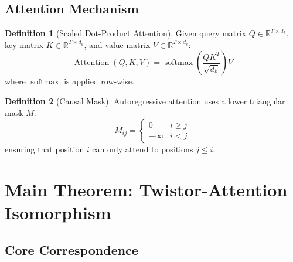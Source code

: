 \documentclass[12pt,a4paper]{article}
\theoremstyle{definition}
\newtheorem{definition}{Definition}[section]
\DeclareMathOperator{\Attention}{Attention}
\DeclareMathOperator{\softmax}{softmax}
\begin{document}
\subsection{Attention Mechanism}

\begin{definition}[Scaled Dot-Product Attention]
Given query matrix $Q \in \mathbb{R}^{T \times d_k}$, key matrix $K \in \mathbb{R}^{T \times d_k}$, and value matrix $V \in \mathbb{R}^{T \times d_v}$:
\begin{equation}\label{eq:attention}
\Attention(Q, K, V) = \softmax\left(\frac{QK^T}{\sqrt{d_k}}\right) V
\end{equation}
where $\softmax$ is applied row-wise.
\end{definition}

\begin{definition}[Causal Mask]
Autoregressive attention uses a lower triangular mask $M$:
\begin{equation}\label{eq:causal_mask}
M_{ij} = \begin{cases}
0 & i \geq j \\
-\infty & i < j
\end{cases}
\end{equation}
ensuring that position $i$ can only attend to positions $j \leq i$.
\end{definition}

\section{Main Theorem: Twistor-Attention Isomorphism}

\subsection{Core Correspondence}
\end{document}
